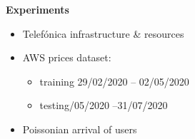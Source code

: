 \documentclass[aspectratio=169]{beamer}
\begin{document}
\begin{frame}
    \frametitle{\secname}
    \framesubtitle{\subsecname}

    \textbf{Experiments}
    \begin{itemize}
        \item Telefónica infrastructure \& resources~\cite{tid}
        \item AWS prices dataset:
            \begin{itemize}
                \item training 29/02/2020 -- 02/05/2020
                \item testing/05/2020 --31/07/2020
            \end{itemize}
        \item Poissonian arrival of users
    \end{itemize}
\end{frame}
\end{document}

